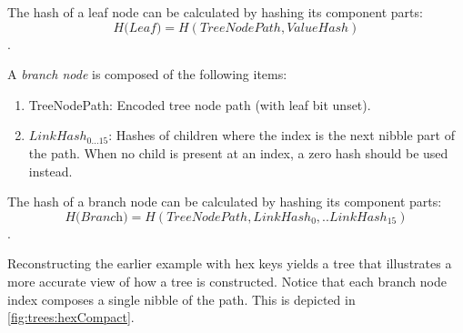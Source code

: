 The hash of a leaf node can be calculated by hashing its component parts: $$\textit{H(Leaf)}=H(TreeNodePath, ValueHash)$$.

A \emph{branch node} is composed of the following items:
\begin{enumerate}
	\item{TreeNodePath: Encoded tree node path (with leaf bit unset).}
	\item{$LinkHash_{0...15}$: Hashes of children where the index is the next nibble part of the path.
	When no child is present at an index, a zero hash should be used instead.}
\end{enumerate}

The hash of a branch node can be calculated by hashing its component parts: $$\textit{H(Branch)}=H(TreeNodePath, LinkHash_0,..LinkHash_{15})$$.

Reconstructing the earlier example with hex keys yields a tree that illustrates a more accurate view of how a \codenamespace tree is constructed.
Notice that each branch node index composes a single nibble of the path.
This is depicted in \autoref{fig:trees:hexCompact}.

\begin{figure}[ht]
\end{figure}

